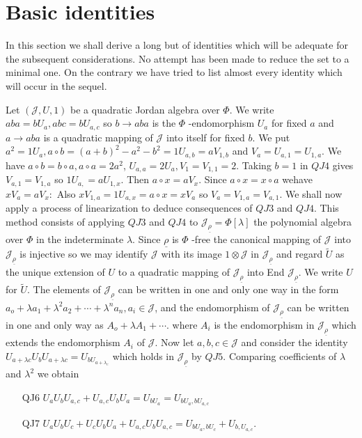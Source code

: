 \section{Basic identities}\label{c1:sec3}

In this section we shall derive a long but of identities which will be
adequate for the subsequent considerations. No attempt has been made
to reduce the set to a minimal one. On the contrary we have tried to
list almost every identity which will occur in the sequel. 

Let $(\mathscr{J},U,1)$ be a quadratic Jordan algebra over $\Phi$. We
write $aba=bU_a, abc=bU_{a,c}$ so $b\to aba$ is the $\Phi$
-endomorphism $U_a$ for fixed $a$ and $a\to aba$ is a quadratic
mapping of $\mathscr{J}$ into itself for fixed $b$. We put
$a^{2}=1U_a, a\circ b=(a+b)^{2}-a^{2}-b^{2}=1U_{a,b}=aV_{1,b}$ and
$V_a=U_{a,1}=U_{1,a}$. We have $a\circ b=b \circ a, a\circ a=2a^{2}$,
$U_{a,a}=2U_a,V_1=V_{1,1}=2$. Taking $b=1$ in $QJ4$ gives
$V_{a,1}=V_{1,a}$ so $1U_{a,} =aU_{1,x}$. Then $a\circ x=aV_x$. Since $a\circ
x=x\circ a$ we\pageoriginale have $xV_a=aV_x:$ Also
$xV_{1,a}=1U_{a,x}=a\circ x =xV_a$ so $V_a=V_{1,a}=V_{a,1}$. We shall
now apply a process of linearization to deduce consequences of $QJ3$
and $QJ4$. This method consists of applying $QJ3$ and $QJ4$ to
$\mathscr{J}_{\underline{\rho}}=\Phi[\lambda]$  the polynomial algebra
over $\Phi$ in the indeterminate $\lambda$. Since $\underline{\rho}$
is $\Phi$ -free the canonical mapping of $\mathscr{J}$ into
$\mathscr{J}_{\underline{\rho}}$ is injective so we may identify
$\mathscr{J}$ with its image $1\otimes \mathscr{J}$ in
$\mathscr{J}_{\underline{\rho}}$ and regard $\widetilde{U}$ as the
unique extension of $U$ to a quadratic mapping of
$\mathscr{J}_{\underline{\rho}}$ into End
$\mathscr{J}_{\underline{\rho}}$. We write $U$ for
$\widetilde{U}$. The elements of $\mathscr{J}_{\underline{\rho}}$ can
be written in one and only one way in the form $a_o+\lambda
a_1+\lambda^{2}a_2+\cdots+\lambda^{n} a_n, a_i\in \mathscr{J}$, and
the endomorphism of $\mathscr{J}_{\underline{\rho}}$ can be written in
one and only way as $A_o+\lambda A_1+\cdots$. where $A_i$ is the
endomorphism in $\mathscr{J}_{\underline{\rho}}$ which extends the
endomorphism $A_i$ of $\mathscr{J}$. Now let $a,b,c\in \mathscr{J}$
and consider the identity $U_{a+\lambda c}U_bU_{a+\lambda
  c}=U_{bU_{a+\lambda_{c}}}$ which holds in
$\mathscr{J}_{\underline{\rho}}$ by $QJ5$. Comparing coefficients of
$\lambda$ and $\lambda^{2}$ we obtain 
\begin{itemize}
\item[QJ6] $U_aU_bU_{a,c}+U_{a,c}U_b U_a=U_{bU_a}=U_{bU_{a},bU_{a,c}}$

\item[QJ7] $U_a U_b U_c+U_c U_b U_a+ U_{a,c} U_b U_{a,c}=U_{b
  U_a,bU_c}+U_{b, U_{a,c}}$. 
\end{itemize}
